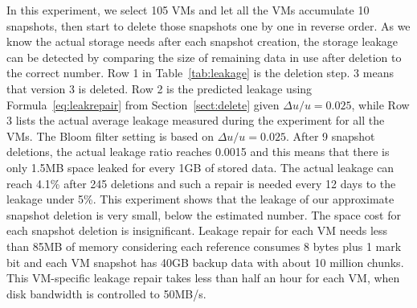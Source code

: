 In this experiment, we select 105 VMs and let all the VMs accumulate 10 snapshots, 
then start to delete those snapshots one by one in reverse order.
As we know the actual storage needs after each snapshot creation,
the storage leakage can be detected by
comparing the size of remaining data in use after deletion to the correct number.
Row 1 in  Table~\ref{tab:leakage} 
is the deletion step. 3 means that version 3 is deleted. 
Row  2 is the predicted leakage using Formula~\ref{eq:leakrepair} from Section~\ref{sect:delete}
given $\Delta u/u=0.025$,
while Row 3 lists the actual average leakage measured during the experiment for all the VMs. 
The Bloom filter setting is based on $\Delta u/u=0.025$.
After 9 snapshot deletions, the actual leakage ratio reaches 0.0015 and this means that
there is only 1.5MB space leaked for every 1GB of stored data.
The actual leakage can reach  4.1\% after  245 deletions and such a repair is needed every 12 days
to the  leakage under 5\%. 
This experiment shows that the leakage of our approximate snapshot deletion is very small, 
below the estimated number.
The space cost for each snapshot deletion is insignificant.
Leakage repair for each VM needs less than 85MB of memory
considering each reference consumes 8 bytes plus  1 mark bit and  
each VM snapshot has 40GB backup data with about 10 million chunks. 
This VM-specific leakage  repair takes  less than half an hour for each VM, 
when disk bandwidth is controlled to 50MB/s. 




